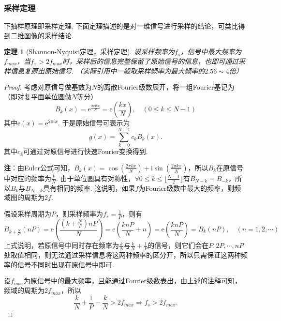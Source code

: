 \documentclass[12pt, a4paper, oneside]{ctexart}
\newtheorem{theorem}{定理}[section] %
\numberwithin{equation}{section}  %
\let\leq=\leqslant %
\def\e{\mathrm{e}}          %
\def\i{\mathrm{i}}          %
\def\add{\vspace{1ex}}      %
\begin{document}
\subsubsection{采样定理}
下抽样原理即采样定理. 下面定理描述的是对一维信号进行采样的结论，可类比得到二维图像的采样结论.
\begin{theorem}[Shannon-Nyquist定理，采样定理]
    设采样频率为$f_s$，信号中最大频率为$f_{max}$，当$f_x > 2f_{max}$时，采样后的信息完整保留了原始信号的信息，也即可通过采样信息复原出原始信号. （实际引用中一般取采样频率为最大频率的$2.56\sim 4$倍）
\end{theorem}
\begin{proof}
    考虑对原信号做基数为$N$的离散Fourier级数展开，将一组Fourier基记为（即对复平面单位圆做$N$等分）
    \begin{equation*}
     B_k(x) = \e^{\frac{2\pi\i kx}{N}} = \e\left(\frac{kx}{N}\right),\quad (0\leq k\leq N-1)   
    \end{equation*}
    其中$\e(x) = \e^{2\pi ix}$. 于是原始信号可表示为
    \begin{equation*}
        g(x) = \sum_{k=0}^{N-1}c_kB_k(x).
    \end{equation*}
    其中$c_k$可通过对原信号进行快速Fourier变换得到.\add

    \textbf{注}：由Euler公式可知，$B_k(x) = \cos(\frac{2\pi kx}{N}) + \i \sin(\frac{2\pi kx}{N})$，\add 所以$B_k$在原信号中对应的频率为$\frac{k}{N}$. 由于单位圆具有对称性，$\forall 0\leq k\leq \lfloor\frac{N-1}{2}\rfloor$有$B_{N-k} = B_{-k}$，\add 所以$B_k$与$B_{N-k}$具有相同的频率. 这说明，如果$f$为Fourier级数中最大的频率，则频域图的周期为$2f$.

    假设采样周期为$P$，则采样频率为$f_s = \frac{1}{P}$，则有
    \begin{equation*}
        B_{k+\frac{N}{P}}(nP) = \e\left(\frac{(k+\frac{N}{P})nP}{N}\right) = \e\left(\frac{knP}{N}+n\right)=\e\left(\frac{knP}{N}\right) = B_k(nP),\quad(n=1,2,\cdots)
    \end{equation*}
    上式说明，若原信号中同时存在频率为$\frac{k}{N}$与$\frac{k}{N}+\frac{1}{P}$的信号，\add 则它们会在$P,2P,\cdots, nP$处取值相同，则无法通过采样信息将这两种频率的区分开，所以只需保证这两种频率的信号不同时出现在原信号中即可.

    设$f_{max}$为原信号中的最大频率，且能通过Fourier级数表出，由上述的注释可知，频域的周期为$2f_{max}$，所以
    \begin{equation*}
        \frac{k}{N}+\frac{1}{P} - \frac{k}{N} > 2f_{max}\Rightarrow f_s > 2f_{max}.
    \end{equation*}
\end{proof}
\end{document}
